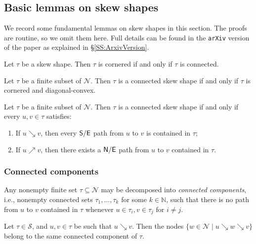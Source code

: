 \documentclass[Unicode,ALCO]{cedram}
\newcommand{\N}{\mathcal{N}}
\newcommand{\SSSS}{\mathcal{S}}
\newcommand{\0}{{\bar 0}}
\newcommand{\NN}{{\mathbb N}}
\newcommand{\so}{{\sf S}}
\newcommand{\no}{{\sf N}}
\newcommand{\ea}{{\sf E}}
\begin{document}
\subsection{Basic lemmas on skew shapes}
We record some fundamental lemmas on skew shapes in this section. The proofs are routine, so we omit them here. Full details can be found in the \texttt{arXiv} version of the paper as explained in \S\ref{SS:ArxivVersion}. 

\begin{lemma}\label{skew:cornered=connected}
Let \(\tau\) be a skew shape. Then \(\tau\) is cornered if and only if \(\tau\) is connected.
\end{lemma}


\begin{lemma}\label{CSS=PDC}
Let \(\tau\) be a finite subset of \(\N\). Then \(\tau\) is a connected skew shape if and only if \(\tau\) is cornered and diagonal-convex.
\end{lemma}


\begin{lemma}\label{pathcrit}
Let \(\tau\) be a finite subset of \(\N\). Then \(\tau\) is a connected skew shape if and only if every \(u,v \in \tau\) satisfies:
\begin{enumerate}
\item If \(u \searrow v\), then every \(\so/\ea\) path from \(u\) to \(v\) is contained in \(\tau\);
\item If \(u \nearrow v\), then there exists a \(\no/\ea\) path from \(u\) to \(v\) contained in \(\tau\).
\end{enumerate}
\end{lemma}


\subsubsection{Connected components}
Any nonempty finite set \(\tau \subseteq \N\) may be decomposed into {\em connected components}, i.e., nonempty connected sets \(\tau_1, \ldots, \tau_k\) for some \(k \in \NN\), such that there is no path from \(u\) to \(v\) contained in \(\tau\) whenever \(u \in \tau_i, v \in \tau_j\) for \(i \neq j\).

\begin{lemma}\label{seconnect}
Let \(\tau \in \SSSS\), and \(u,v \in \tau\) be such that \(u \searrow v\). Then the nodes \(\{w \in \N \mid u \searrow w \searrow v\}\) belong to the same connected component of \(\tau\).
\end{lemma}
\end{document}
